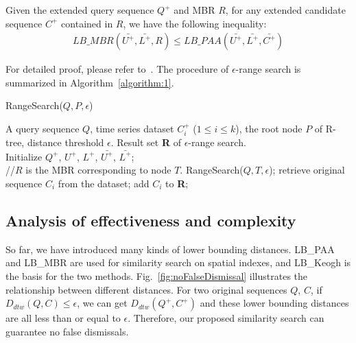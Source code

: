 \documentclass[10pt,journal,compsoc]{IEEEtran}
\begin{document}
Given the extended query sequence $Q^+$ and MBR $R$,
for any extended candidate sequence $C^+$ contained in $R$,
we have the following inequality:
\begin{equation}\label{eq:DistMBR}
\begin{split}
	LB\_MBR(\bar{U^+},\bar{L^+},R) \leq  LB\_{PAA}(\bar{U^+},\bar{L^+},\bar{C^+})
\end{split}
\end{equation}

For detailed proof, please refer to~\cite{keogh2005exact}.
The procedure of $\epsilon$-range search is summarized in Algorithm~\ref{algorithm:1}.
\begin{algorithm}[h]
\caption{ RangeSearch($Q,P,\epsilon$)}\label{algorithm:1}
\begin{algorithmic}[1]
\REQUIRE A query sequence $Q$, time series dataset $C_i^+$ ($1 \leq i \leq k$),
the root node $P$ of R-tree, distance threshold $\epsilon$.
\ENSURE Result set \textbf{R} of $\epsilon$-range search. \\
\STATE Initialize $Q^+$, $U^+$, $L^+$, $\bar{U^+}$, $\bar{L^+}$; \\
\STATE //$R$ is the MBR corresponding to node $T$.
\STATE RangeSearch($Q,T,\epsilon$);
\ENDIF
\ENDFOR
\ELSE
{}
\STATE retrieve original sequence $C_i$ from the dataset;
\ENDIF
{}
\STATE add $C_i$ to \textbf{R};
\ENDIF
\ENDFOR
\ENDIF
\end{algorithmic}
\end{algorithm}


\subsection{Analysis of effectiveness and complexity}


So far, we have introduced many kinds of lower bounding distances.
LB\_PAA and LB\_MBR are used for similarity search on spatial indexes,
and LB\_Keogh is the basis for the two methods.
Fig.~\ref{fig:noFalseDismissal} illustrates the relationship between different distances.
For two original sequences $Q$, $C$,
if $D_{dtw}(Q,C) \leq \epsilon$,
we can get $D_{dtw}(Q^+,C^+)$ and these lower bounding distances
are all less than or equal to $\epsilon$.
Therefore, our proposed similarity search can guarantee no false dismissals.
\end{document}
